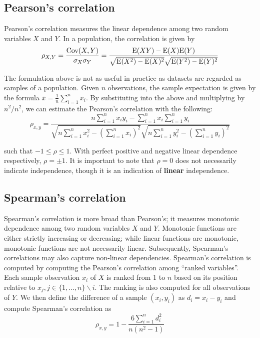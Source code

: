 \subsection{Pearson's correlation}

Pearson's correlation measures the linear dependence among two random variables
$X$ and $Y$. In a population, the correlation is given by
$$\rho_{X,Y}=\frac{\mathrm{Cov}(X,Y)}{\sigma_X \sigma_Y} =
\frac{\mathrm{E}(XY)-\mathrm{E}(X)\mathrm{E}(Y)}{\sqrt{\mathrm{E}(X^2)-\mathrm{E}(X)^2} \sqrt{\mathrm{E}(Y^2)-\mathrm{E}(Y)^2}}$$ 

The formulation above is not as useful in practice as datasets are regarded as
samples of a population. Given $n$ observations, the sample expectation is given
by the formula  $\bar{x}=\frac{1}{n}\sum\limits_{i=1}^{n}x_i$. By substituting
into the above and multiplying by $n^2/n^2$, we can estimate the Pearson's
correlation with the following:
$$\rho_{x,y}=
\frac{n \sum\limits_{i=1}^{n} x_i y_i - \sum\limits_{i=1}^{n} x_i
	\sum\limits_{i=1}^{n} y_i}
{\sqrt{n\sum\limits_{i=1}^{n} x_i^2-\left(\sum\limits_{i=1}^{n} x_i\right)^2} 
	\sqrt{n\sum\limits_{i=1}^{n} y_i^2-\left(\sum\limits_{i=1}^{n} y_i\right)^2}}$$ 

\noindent such that $-1 \leq \rho \leq 1$. With perfect positive and negative 
linear 
dependence respectively, $\rho=\pm1$.
It is important to note that $\rho=0$ does not necessarily indicate
independence, though it is an indication of \textbf{linear} independence.

\subsection{Spearman's correlation}

Spearman's correlation is more broad than Pearson's; it measures monotonic
dependence among two random variables $X$ and $Y$. Monotonic functions are
either strictly increasing or decreasing; while linear functions are monotonic,
monotonic functions are not necessarily linear. Subsequently, Spearman's
correlations may also capture non-linear dependencies. Spearman's correlation is
computed by computing the Pearson's correlation among ``ranked variables''. Each
sample observation $x_i$ of $X$ is ranked from 1 to $n$ based on its position
relative to $x_j, j\in\{1,...,n\}\backslash{i}$. The ranking is also computed
for all observations of $Y$. We then define the difference of a sample
$(x_i,y_i)$ as $d_i=x_i-y_i$ and compute Spearman's correlation as
$$\rho_{x,y}=1-\frac{6 \sum\limits_{i=1}^{n}d_i^2}{n(n^2-1)}$$


